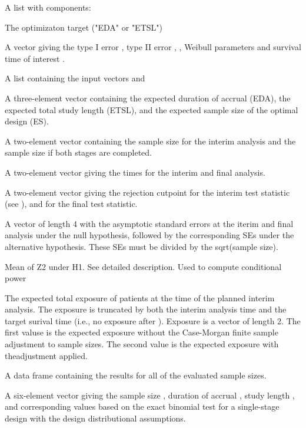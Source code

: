 \begin{Value}
A list with components:
\begin{ldescription}
\item[\code{target}] The optimizaton target ("EDA" or "ETSL")
\item[\code{test}] A vector giving the type I error , type II
error , , Weibull parameters  and survival time
of interest .
\item[\code{accrual}] A list containing the input vectors  and
\item[\code{result}] A three-element vector containing the expected duration of
accrual (EDA), the expected total study length (ETSL), and the expected sample size of the optimal
design (ES).
\item[\code{n}] A two-element vector containing the sample size for the
interim analysis and the sample size if both stages are completed.
\item[\code{stageTime}] A two-element vector giving the times for the interim and
final analysis.
\item[\code{boundary}] A two-element vector giving  the rejection cutpoint 
for the interim test statistic (see ), and  
for the final test statistic.
\item[\code{se}] A vector of length 4 with the asymptotic standard errors
at the iterim and final analysis under the null hypothesis, followed
by the corresponding SEs under the alternative hypothesis.  These SEs
must be divided by the sqrt(sample size).
\item[\code{u}] Mean of Z2 under H1.  See detailed description.  Used to
compute conditional power
\item[\code{exposure}] The expected total exposure of patients at the time
of the planned interim analysis.  The exposure is truncated by both
the interim analysis time and the target surival time (i.e., no
exposure after ).  Exposure is a vector of length 2.  The
first valuse is the expected exposure without the Case-Morgan finite sample
adjustment to sample sizes.  The second value is the expected exposure with theadjustment applied.
\item[\code{all.info}] A data frame containing the results
for all of the evaluated sample sizes. 
\item[\code{single.stage}] A six-element vector giving the  sample
size , duration of accrual ,  study length
, and corresponding values based on the exact binomial test for a single-stage design with the design distributional assumptions. 
\end{ldescription}
\end{Value}
